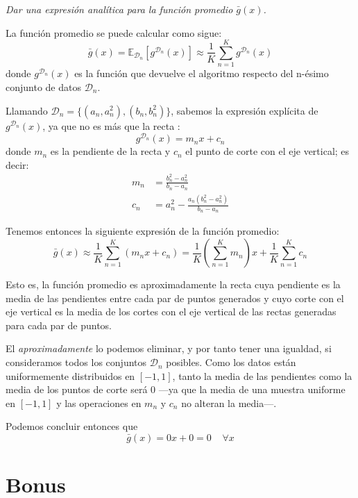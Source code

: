 \documentclass[a4paper, 11pt]{article}
\begin{document}
    \begin{solucion}
        \emph{Dar una expresión analítica para la función promedio $\bar{g}(x)$.}

        La función promedio se puede calcular como sigue:
        \[
        \bar{g}(x) = \mathbb{E}_{\mathcal{D}_n}[g^{\mathcal{D}_n}(x)] \approx \frac{1}{K} \sum_{n=1}^K g^{\mathcal{D}_n}(x)
        \]
        donde $g^{\mathcal{D}_n}(x)$ es la función que devuelve el algoritmo respecto del n-ésimo conjunto de datos $\mathcal{D}_n$.

        Llamando $\mathcal{D}_n =\{(a_n, a_n^2), (b_n, b_n^2)\}$, sabemos la expresión explícita de $g^{\mathcal{D}_n}(x)$, ya que no es más que la recta :
        \[
        g^{\mathcal{D}_n}(x) = m_n x + c_n
        \]
        donde $m_n$ es la pendiente de la recta y $c_n$ el punto de corte con el eje vertical; es decir:
        \begin{align*}
            m_n &= \frac{b_n^2 - a_n^2}{b_n - a_n} \\
            c_n &= a_n^2 - \frac{a_n (b_n^2-a_n^2)}{b_n - a_n}
        \end{align*}

        Tenemos entonces la siguiente expresión de la función promedio:
        \begin{equation}
            \bar{g}(x) \approx \frac{1}{K} \sum_{n=1}^K (m_n x + c_n) = \frac{1}{K} \left( \sum_{n=1}^K m_n \right) x  +  \frac{1}{K} \sum_{n=1}^K c_n
            \label{eq:barg}
        \end{equation}

        Esto es, la función promedio es aproximadamente la recta cuya pendiente es la media de las pendientes entre cada par de puntos generados y cuyo corte con el eje vertical es la media de los cortes con el eje vertical de las rectas generadas para cada par de puntos.

        El \emph{aproximadamente} lo podemos eliminar, y por tanto tener una igualdad, si consideramos todos los conjuntos $\mathcal{D}_n$ posibles. Como los datos están uniformemente distribuidos en $[-1, 1]$, tanto la media de las pendientes como la media de los puntos de corte será 0 ---ya que la media de una muestra uniforme en $[-1,1]$ y las operaciones en $m_n$ y $c_n$ no alteran la media---.

        Podemos concluir entonces que
        \[
        \bar{g}(x) = 0x + 0 = 0 \;\;\;\; \forall x
        \]
    \end{solucion}


    \section{Bonus}
\end{document}
